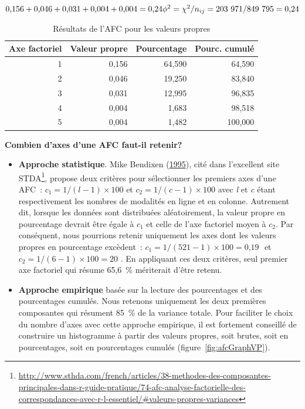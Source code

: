 \documentclass[
  11pt,
  french,
]{book}
\renewcommand{\href}[2]{#2\footnote{\url{#1}}}
\begin{document}
\(\mbox{0,156}+\mbox{0,046}+\mbox{0,031}+\mbox{0,004}+\mbox{0,004} = \mbox{0,24} \\ \phi^2 = \chi^2 / n_{ij}=\mbox{203 971}/ \mbox{849 795} = \mbox{0,24}\)

\begin{table}

\caption{\label{tab:dataafcValeurPropres}Résultats de l'AFC pour les valeurs propres}
\centering
\fontsize{8}{10}\selectfont
\begin{tabular}[t]{rrrr}
\toprule
Axe factoriel & Valeur propre & Pourcentage & Pourc. cumulé\\
\midrule
1 & 0,156 & 64,590 & 64,590\\
2 & 0,046 & 19,250 & 83,840\\
3 & 0,031 & 12,995 & 96,835\\
4 & 0,004 & 1,683 & 98,518\\
5 & 0,004 & 1,482 & 100,000\\
\bottomrule
\end{tabular}
\end{table}

\textbf{Combien d'axes d'une AFC faut-il retenir?}

\begin{itemize}
\item
  \textbf{Approche statistique}. Mike Bendixen (\protect\hyperlink{ref-bendixen1995compositional}{1995}), cité dans l'excellent site \href{http://www.sthda.com/french/articles/38-methodes-des-composantes-principales-dans-r-guide-pratique/74-afc-analyse-factorielle-des-correspondances-avec-r-l-essentiel/\#valeurs-propres-variances}{STDA}, propose deux critères pour sélectionner les premiers axes d'une AFC~: \(c_1= 1 / (l-1) \times 100\) et \(c_2= 1 / (c-1) \times 100\) avec \emph{l} et \emph{c} étant respectivement les nombres de modalités en ligne et en colonne. Autrement dit, lorsque les données sont distribuées aléatoirement, la valeur propre en pourcentage devrait être égale à \(c_1\) et celle de l'axe factoriel moyen à \(c_2\). Par conséquent, nous pourrions retenir uniquement les axes dont les valeurs propres en pourcentage excèdent~: \(c_1 = \mbox{1}/(\mbox{521}-\mbox{1})\times \mbox{100}=\mbox{0,19 }%
  \) et \(c_2=\mbox{1}/(\mbox{6}-\mbox{1})\times \mbox{100}=\mbox{20 }%
  \). En appliquant ces deux critères, seul premier axe factoriel qui résume 65,6~\% mériterait d'être retenu.
\item
  \textbf{Approche empirique} basée sur la lecture des pourcentages et des pourcentages cumulés. Nous retenons uniquement les deux premières composantes qui résument 85~\% de la variance totale. Pour faciliter le choix du nombre d'axes avec cette approche empirique, il est fortement conseillé de construire un histogramme à partir des valeurs propres, soit brutes, soit en pourcentages, soit en pourcentages cumulés (figure~\ref{fig:afcGraphVP}).
\end{itemize}
\end{document}
